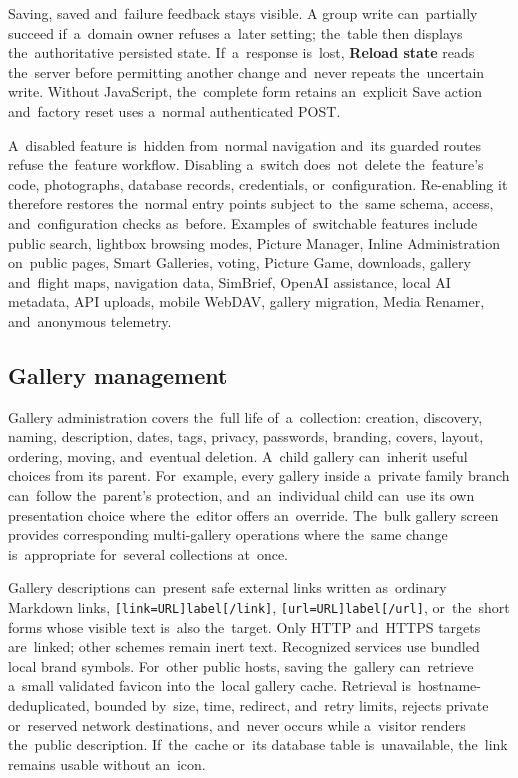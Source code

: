 \documentclass[11pt,a4paper]{article}
\newcommand{\ui}[1]{\textbf{#1}}
\newcommand{\codeword}[1]{\nolinkurl{#1}}
\begin{document}
Saving, saved and~failure feedback stays visible. A group write can~partially
succeed if~a~domain owner refuses a~later setting; the~table then displays
the~authoritative persisted state. If~a~response is~lost, \ui{Reload state}
reads the~server before permitting another change and~never repeats
the~uncertain write. Without JavaScript, the~complete form retains an~explicit
Save action and~factory reset uses a~normal authenticated POST.

A~disabled feature is~hidden from~normal navigation and~its guarded routes
refuse the~feature workflow. Disabling a~switch does~not~delete the~feature's
code, photographs, database records, credentials, or~configuration. Re-enabling
it therefore restores the~normal entry points subject to~the~same schema,
access, and~configuration checks as~before. Examples of~switchable features
include public search, lightbox browsing modes, Picture Manager, Inline
Administration on~public pages, Smart Galleries, voting, Picture Game,
downloads, gallery and~flight maps, navigation data, SimBrief, OpenAI
assistance, local AI metadata, API uploads, mobile WebDAV, gallery migration,
Media Renamer, and~anonymous telemetry.

\subsection{Gallery management}

Gallery administration covers the~full life of~a~collection: creation,
discovery, naming, description, dates, tags, privacy, passwords, branding,
covers, layout, ordering, moving, and~eventual deletion. A~child gallery
can~inherit useful choices from its parent. For~example, every gallery inside
a~private family branch can~follow the~parent's protection, and~an~individual
child can~use its own presentation choice where the~editor offers an~override.
The~bulk gallery screen provides corresponding multi-gallery operations where
the~same change is~appropriate for~several collections at~once.

Gallery descriptions can~present safe external links written as~ordinary
Markdown links, \codeword{[link=URL]label[/link]},
\codeword{[url=URL]label[/url]}, or~the~short forms whose visible text is~also
the~target. Only HTTP and~HTTPS targets are~linked; other schemes remain inert
text. Recognized services use bundled local brand symbols. For~other public
hosts, saving the~gallery can~retrieve a~small validated favicon into the~local
gallery cache. Retrieval is~hostname-deduplicated, bounded by~size, time,
redirect, and~retry limits, rejects private or~reserved network destinations,
and~never occurs while a~visitor renders the~public description. If~the~cache
or~its database table is~unavailable, the~link remains usable without an~icon.
\end{document}
